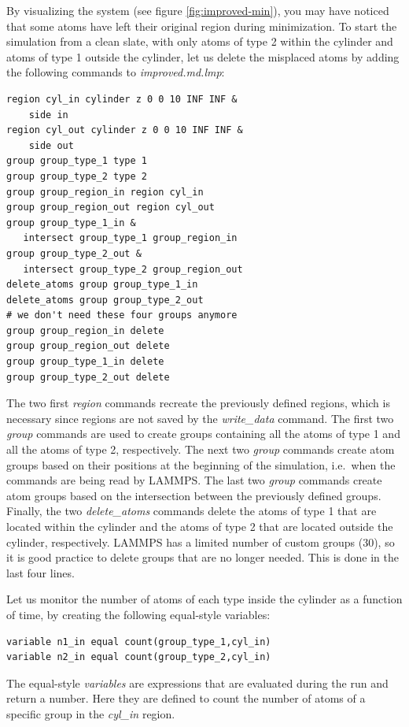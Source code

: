 \documentclass[9pt,tutorial]{livecoms}
\begin{document}
By visualizing the system (see figure \ref{fig:improved-min}), you may
have noticed that some atoms have left their original region during
minimization.  To start the simulation from a clean slate, with only
atoms of type 2 within the cylinder and atoms of type 1 outside the
cylinder, let us delete the misplaced atoms by adding the following
commands to \textit{improved.md.lmp}:

\begin{lstlisting}
region cyl_in cylinder z 0 0 10 INF INF &
    side in
region cyl_out cylinder z 0 0 10 INF INF &
    side out
group group_type_1 type 1
group group_type_2 type 2
group group_region_in region cyl_in
group group_region_out region cyl_out
group group_type_1_in &
   intersect group_type_1 group_region_in
group group_type_2_out &
   intersect group_type_2 group_region_out
delete_atoms group group_type_1_in
delete_atoms group group_type_2_out
# we don't need these four groups anymore
group group_region_in delete
group group_region_out delete
group group_type_1_in delete
group group_type_2_out delete
\end{lstlisting}

The two first \textit{region} commands recreate the previously defined
regions, which is necessary since regions are not saved by the
\textit{write\_data} command.  The first two \textit{group} commands are
used to create groups containing all the atoms of type 1 and all the
atoms of type 2, respectively.  The next two \textit{group} commands
create atom groups based on their positions at the beginning of the
simulation, i.e.~when the commands are being read by LAMMPS.  The last
two \textit{group} commands create atom groups based on the intersection
between the previously defined groups.  Finally, the two
\textit{delete\_atoms} commands delete the atoms of type 1 that are
located within the cylinder and the atoms of type 2 that are located
outside the cylinder, respectively.  LAMMPS has a limited number of
custom groups (30), so it is good practice to delete groups that are no
longer needed.  This is done in the last four lines.

Let us monitor the number of atoms of each type inside the cylinder as a
function of time, by creating the following equal-style variables:
\begin{lstlisting}
variable n1_in equal count(group_type_1,cyl_in)
variable n2_in equal count(group_type_2,cyl_in)
\end{lstlisting}
The equal-style \textit{variables} are expressions that are evaluated
during the run and return a number.  Here they are defined to count
the number of atoms of a specific group in the \textit{cyl\_in} region.
\end{document}
